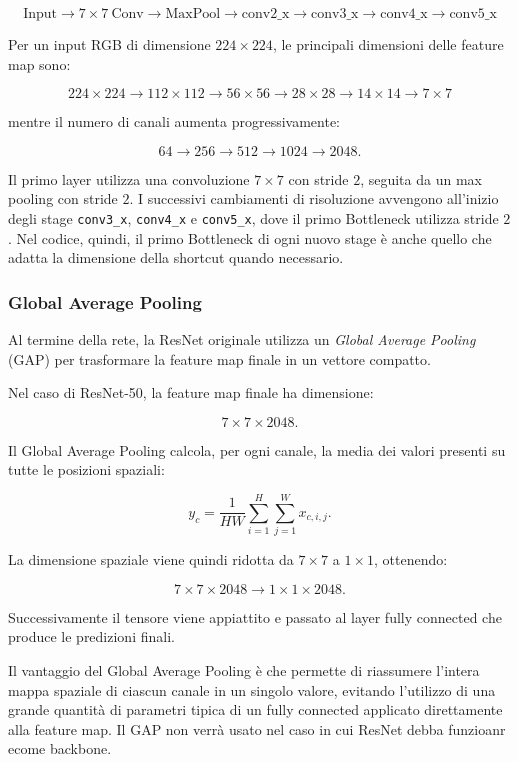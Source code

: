 \[
\text{Input}
\rightarrow
7\times7\ \text{Conv}
\rightarrow
\text{MaxPool}
\rightarrow
\text{conv2\_x}
\rightarrow
\text{conv3\_x}
\rightarrow
\text{conv4\_x}
\rightarrow
\text{conv5\_x}
\]

Per un input RGB di dimensione $224\times224$, le principali dimensioni delle
feature map sono:

\[
224\times224
\rightarrow
112\times112
\rightarrow
56\times56
\rightarrow
28\times28
\rightarrow
14\times14
\rightarrow
7\times7
\]

mentre il numero di canali aumenta progressivamente:

\[
64
\rightarrow
256
\rightarrow
512
\rightarrow
1024
\rightarrow
2048.
\]

Il primo layer utilizza una convoluzione $7\times7$ con stride $2$, seguita da
un max pooling con stride $2$. I successivi cambiamenti di risoluzione avvengono
all'inizio degli stage \texttt{conv3\_x}, \texttt{conv4\_x} e \texttt{conv5\_x},
dove il primo Bottleneck utilizza stride $2$. Nel codice, quindi, il primo
Bottleneck di ogni nuovo stage è anche quello che adatta la dimensione della
shortcut quando necessario.



\subsubsection{Global Average Pooling}

Al termine della rete, la ResNet originale utilizza un \textit{Global Average
Pooling} (GAP) per trasformare la feature map finale in un vettore compatto.

Nel caso di ResNet-50, la feature map finale ha dimensione:

\[
7\times7\times2048.
\]

Il Global Average Pooling calcola, per ogni canale, la media dei valori presenti
su tutte le posizioni spaziali:

\[
y_c = \frac{1}{H W}
\sum_{i=1}^{H}\sum_{j=1}^{W} x_{c,i,j}.
\]

La dimensione spaziale viene quindi ridotta da $7\times7$ a $1\times1$,
ottenendo:

\[
7\times7\times2048
\rightarrow
1\times1\times2048.
\]

Successivamente il tensore viene appiattito e passato al layer fully connected
che produce le predizioni finali.

Il vantaggio del Global Average Pooling è che permette di riassumere l'intera
mappa spaziale di ciascun canale in un singolo valore, evitando l'utilizzo di
una grande quantità di parametri tipica di un fully connected applicato
direttamente alla feature map.
Il GAP non verrà usato nel caso in cui ResNet debba funzioanr ecome backbone.